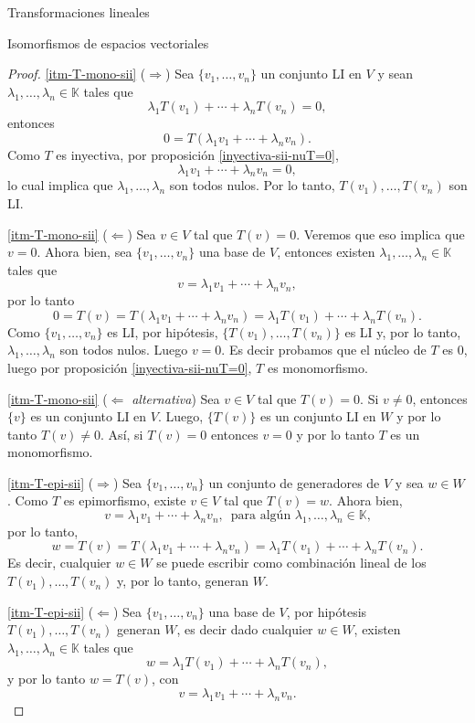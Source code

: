 \documentclass[a4paper,12pt,twoside,spanish,reqno]{amsbook}
\numberwithin{equation}{section}
\theoremstyle{definition}
\theoremstyle{remark}
\newcommand{\K}{\mathbb K}
\begin{document}
\begin{chapter}{Transformaciones lineales}
\begin{section}{Isomorfismos de espacios vectoriales}
\begin{proof}
            
            \ref{itm-T-mono-sii} ($\Rightarrow$) Sea $\{v_1,\ldots,v_n \}$ un conjunto LI en $V$ y sean  $\lambda_1,\ldots,\lambda_n \in \K$ tales que
            $$
            \lambda_1T(v_1) +\cdots+ \lambda_{n}T(v_n) =0,
            $$
            entonces
            $$
            0 = T(\lambda_1v_1+\cdots + \lambda_{n}v_n).
            $$
            Como $T$  es inyectiva, por proposición \ref{inyectiva-sii-nuT=0}, 
            $$
            \lambda_1v_1+\cdots + \lambda_{n}v_n =0,
            $$
            lo cual implica que $\lambda_1,\ldots,\lambda_n$ son todos nulos. Por lo tanto,  $T(v_1),\ldots,T(v_n)$ son LI.
            
            
           \ref{itm-T-mono-sii} ($\Leftarrow$) Sea $v \in V$ tal que $T(v)=0$. Veremos que eso implica que $v =0$.  Ahora bien, sea  $\{v_1,\ldots,v_n \}$ una base de $V$,  entonces existen $\lambda_1,\ldots,\lambda_n \in \K$ tales que
            $$
            v = \lambda_1v_1+\cdots + \lambda_{n}v_n,
            $$
            por lo tanto
            $$
            0 = T(v) = T(\lambda_1v_1+\cdots + \lambda_{n}v_n) = \lambda_1T(v_1) +\cdots+ \lambda_{n}T(v_n).
            $$
            Como $\{v_1,\ldots,v_n \}$ es LI, por hipótesis, $\{T(v_1),\ldots,T(v_n)\}$ es LI y, por lo tanto, $\lambda_1,\ldots,\lambda_n$ son todos nulos. Luego $v=0$. Es decir probamos  que el núcleo de $T$ es 0, luego por proposición \ref{inyectiva-sii-nuT=0}, $T$ es monomorfismo. 

        \ref{itm-T-mono-sii} ($\Leftarrow$ \textit{alternativa}) Sea $v \in V$ tal que $T(v)=0$.	Si $v\neq 0$, entonces $\{v\}$ es un conjunto LI en $V$. Luego, $\{T(v)\}$ es un conjunto LI en $W$ y por lo tanto $T(v)\neq 0$. Así, si $T(v)=0$ entonces $v=0$ y por lo tanto $T$ es un monomorfismo.
              
            \ref{itm-T-epi-sii} ($\Rightarrow$) Sea   $\{v_1,\ldots,v_n \}$ un conjunto de generadores de $V$ y sea  $w \in W$. Como $T$  es epimorfismo, existe $v \in V$ tal que $T(v)=w$. Ahora bien, 
            $$
            v = \lambda_1v_1+\cdots + \lambda_{n}v_n,\, \text{ para algún $\lambda_1,\ldots,\lambda_n \in \K$,}
            $$
            por lo tanto,
            $$
            w =T(v) = T(\lambda_1v_1+\cdots + \lambda_{n}v_n) = \lambda_1T(v_1) +\cdots+ \lambda_{n}T(v_n).
            $$ 
            Es decir,  cualquier $w \in W$ se puede escribir como combinación lineal de los  $T(v_1),\ldots,T(v_n)$ y, por lo tanto,  generan $W$.
            
             \ref{itm-T-epi-sii} ($\Leftarrow$) Sea $\{v_1,\ldots,v_n \}$ una base de $V$, por hipótesis $T(v_1),\ldots,T(v_n)$ generan $W$,  es decir dado cualquier $w \in W$,   existen $\lambda_1,\ldots,\lambda_n \in \K$ tales que
            $$
            w = \lambda_1T(v_1)+\cdots + \lambda_{n}T(v_n),
            $$
            y por lo tanto $w = T(v)$,  con 
            $$
            v = \lambda_1v_1+\cdots + \lambda_{n}v_n.
            $$
        \end{proof}
        

\end{section}
\end{chapter}
\end{document}
